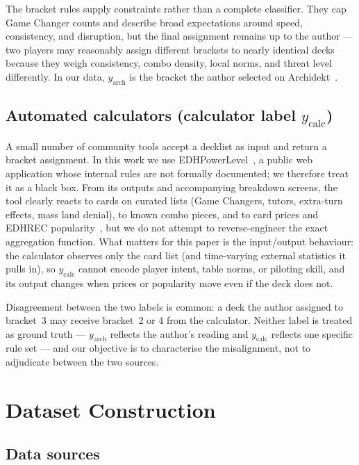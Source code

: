 \documentclass{article}
\begin{document}
The bracket rules supply constraints rather than a complete classifier. They cap Game Changer counts and describe broad expectations around speed, consistency, and disruption, but the final assignment remains up to the author --- two players may reasonably assign different brackets to nearly identical decks because they weigh consistency, combo density, local norms, and threat level differently. In our data, \(y_{\text{arch}}\) is the bracket the author selected on Archidekt~\cite{archidekt}.

\subsection{Automated calculators (calculator label \texorpdfstring{\(y_{\text{calc}}\)}{y\_calc})}
\label{sec:bg:calculator}
A small number of community tools accept a decklist as input and return a bracket assignment. In this work we use EDHPowerLevel~\cite{edhpowerlevel}, a public web application whose internal rules are not formally documented; we therefore treat it as a black box. From its outputs and accompanying breakdown screens, the tool clearly reacts to cards on curated lists (Game Changers, tutors, extra-turn effects, mass land denial), to known combo pieces, and to card prices and EDHREC popularity~\cite{edhrec}, but we do not attempt to reverse-engineer the exact aggregation function. What matters for this paper is the input/output behaviour: the calculator observes only the card list (and time-varying external statistics it pulls in), so \(y_{\text{calc}}\) cannot encode player intent, table norms, or piloting skill, and its output changes when prices or popularity move even if the deck does not.

Disagreement between the two labels is common: a deck the author assigned to bracket~3 may receive bracket~2 or 4 from the calculator. Neither label is treated as ground truth --- \(y_{\text{arch}}\) reflects the author's reading and \(y_{\text{calc}}\) reflects one specific rule set --- and our objective is to characterise the misalignment, not to adjudicate between the two sources.
\section{Dataset Construction}
\label{sec:dataset}

\subsection{Data sources}
\label{sec:data:sources}
\end{document}
